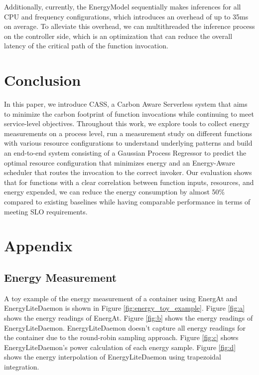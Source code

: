 \documentclass[times, 10pt,twocolumn]{article}
\begin{document}
Additionally, currently, the EnergyModel sequentially makes inferences for all CPU and frequency configurations, which introduces an overhead of up to 35ms on average. To alleviate this overhead, we can multithreaded the inference process on the controller side, which is an optimization that can reduce the overall latency of the critical path of the function invocation. 

\section{Conclusion}

In this paper, we introduce CASS, a Carbon Aware Serverless system that aims to minimize the carbon footprint of function invocations while continuing to meet service-level objectives. Throughout this work, we explore tools to collect energy measurements on a process level, run a measurement study on different functions with various resource configurations to understand underlying patterns and build an end-to-end system consisting of a Gaussian Process Regressor to predict the optimal resource configuration that minimizes energy and an Energy-Aware scheduler that routes the invocation to the correct invoker. Our evaluation shows that for functions with a clear correlation between function inputs, resources, and energy expended, we can reduce the energy consumption by almost 50\% compared to existing baselines while having comparable performance in terms of meeting SLO requirements. 






\appendix
\section{Appendix}
\subsection{Energy Measurement}
\label{appendix:energy_measurement}
A toy example of the energy measurement of a container using EnergAt and EnergyLiteDaemon is shown in Figure \ref{fig:energy_toy_example}. Figure \ref{fig:a} shows the energy readings of EnergAt. Figure \ref{fig:b} shows the energy readings of EnergyLiteDaemon. EnergyLiteDaemon doesn't capture all energy readings for the container due to the round-robin sampling approach. Figure \ref{fig:c} shows EnergyLiteDaemon's power calculation of each energy sample. Figure \ref{fig:d} shows the energy interpolation of EnergyLiteDaemon using trapezoidal integration.
\end{document}
